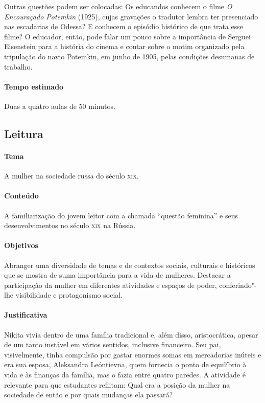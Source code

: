 \documentclass[11pt]{extarticle}
\begin{document}
Outras questões podem ser colocadas: Os educandos conhecem o filme
\emph{O Encouraçado Potemkin} (1925), cujas gravações o tradutor lembra
ter presenciado nas escadarias de Odessa? E conhecem o episódio
histórico de que trata esse filme? O educador, então, pode falar um
pouco sobre a importância de Serguei Eisenstein para a história do
cinema e contar sobre o motim organizado pela tripulação do navio
Potemkin, em junho de 1905, pelas condições desumanas de trabalho.

\paragraph{Tempo estimado} Duas a quatro aulas de 50 minutos.


\subsection{Leitura}

\paragraph{Tema} A mulher na sociedade russa do século \textsc{xix}.


\bnccativividadesleitura

\paragraph{Conteúdo}
A familiarização do jovem leitor com a chamada ``questão feminina'' e
seus desenvolvimentos no século \textsc{xix} na Rússia.

\paragraph{Objetivos}
Abranger uma diversidade de temas e de contextos sociais, culturais e
históricos que se mostra de suma importância para a vida de mulheres.
Destacar a participação da mulher em diferentes atividades e espaços de
poder, conferindo"-lhe visibilidade e protagonismo social.

\paragraph{Justificativa}
Nikita vivia dentro de uma família tradicional e, além disso,
aristocrática, apesar de um tanto instável em vários sentidos, inclusive
financeiro. Seu pai, visivelmente, tinha compulsão por gastar enormes
somas em mercadorias inúteis e era sua esposa, Aleksandra Leóntievna,
quem fornecia o ponto de equilíbrio à vida e às finanças da família, mas
o fazia entre quatro paredes. A atividade é relevante para que
estudantes reflitam: Qual era a posição da mulher na sociedade de então
e por quais mudanças ela passará?
\end{document}
